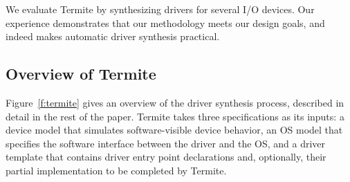 \documentclass{book}
\newcommand{\termite}{Termite\xspace}
\theoremstyle{definition}
\begin{document}
%
%
%
%    
%
%

We evaluate \termite by synthesizing drivers for several I/O devices.  Our experience demonstrates that our methodology meets our design goals, and indeed makes automatic driver synthesis practical.

\subsection{Overview of \termite} Figure~\ref{f:termite} gives an overview of the driver synthesis process, described in detail in the rest of the paper.  \termite takes three specifications as its inputs: a device model that simulates software-visible device behavior, an OS model that specifies the software interface between the driver and the OS, and a driver template that contains driver entry point declarations and, optionally, their partial implementation to be completed by \termite.
\end{document}

